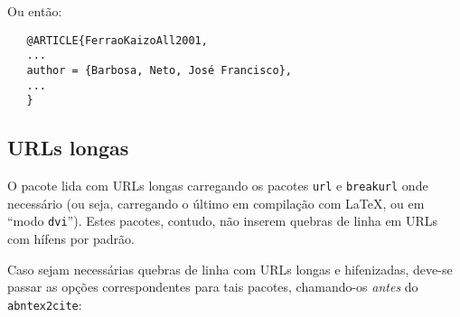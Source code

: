 \documentclass[a4paper]{ltxdoc}
\begin{document}
Ou então:

\begin{verbatim}
   @ARTICLE{FerraoKaizoAll2001,
   ...
   author = {Barbosa, Neto, José Francisco},
   ...
   }

\end{verbatim}

\subsection{URLs longas}

O pacote lida com URLs longas carregando os pacotes \texttt{url} e
\texttt{breakurl} onde necessário (ou seja, carregando o último em
compilação com \LaTeX, ou em ``modo \texttt{dvi}''). Estes pacotes,
contudo, não inserem quebras de linha em URLs com hífens por padrão. 

Caso sejam necessárias quebras de linha com URLs longas e hifenizadas,
deve-se passar as opções correspondentes para tais pacotes, chamando-os
\emph{antes} do \texttt{abntex2cite}:
\end{document}
